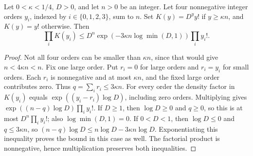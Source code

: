 \begin{lemma}
Let $0<\kappa<1/4$, $D>0$, and let $n>0$ be an integer.
Let four nonnegative integer orders $y_i$, indexed by $i\in\{0,1,2,3\}$,
sum to $n$. Set $K(y)=D^y y!$ if $y\ge\kappa n$, and $K(y)=y!$
otherwise. Then
\[
 \prod_i K(y_i)\le
 D^n\exp(-3\kappa n\log\min(D,1))\prod_i y_i!.
\]
\end{lemma}
\begin{proof}
Not all four orders can be smaller than $\kappa n$, since that would
give $n<4\kappa n<n$. Fix one large order. Put $r_i=0$ for large
orders and $r_i=y_i$ for small orders. Each $r_i$ is nonnegative and
at most $\kappa n$, and the fixed large order contributes zero.
Thus $q=\sum_i r_i\le3\kappa n$.
For every order the density factor in $K(y_i)$ equals
$\exp((y_i-r_i)\log D)$, including zero orders. Multiplying gives
$\exp((n-q)\log D)\prod_i y_i!$.
If $D\ge1$, then $\log D\ge0$ and $q\ge0$, so this is at most
$D^n\prod_i y_i!$; also $\log\min(D,1)=0$.
If $0<D<1$, then $\log D\le0$ and $q\le3\kappa n$, so
$(n-q)\log D\le n\log D-3\kappa n\log D$.
Exponentiating this inequality proves the bound in this case as well.
The factorial product is nonnegative, hence multiplication preserves
both inequalities.
\end{proof}
